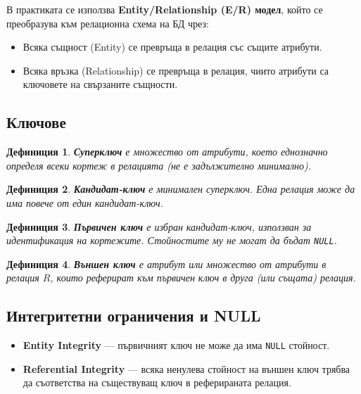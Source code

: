 \documentclass{scrartcl}
\newtheorem{definition}{Дефиниция}
\begin{document}
\begin{FlushLeft}
В практиката се използва \textbf{Entity/Relationship (E/R) модел}, който се преобразува към релационна схема на БД чрез:

\begin{itemize}
    \item Всяка същност (Entity) се превръща в релация със същите атрибути.
    \item Всяка връзка (Relationship) се превръща в релация, чиито атрибути са ключовете на свързаните същности.
\end{itemize}

\subsection{Ключове}

\begin{definition}
\textbf{\textit{Суперключ}} е множество от атрибути, което еднозначно определя всеки кортеж в релацията (не е задължително минимално).
\end{definition}

\begin{definition}
\textbf{\textit{Кандидат-ключ}} е минимален суперключ. Една релация може да има повече от един кандидат-ключ.
\end{definition}

\begin{definition}
\textbf{\textit{Първичен ключ}} е избран кандидат-ключ, използван за идентификация на кортежите. Стойностите му не могат да бъдат \texttt{NULL}.
\end{definition}

\begin{definition}
\textbf{\textit{Външен ключ}} е атрибут или множество от атрибути в релация $R$, които реферират към първичен ключ в друга (или същата) релация.
\end{definition}

\subsection{Интегритетни ограничения и NULL}

\begin{itemize}
    \item \textbf{Entity Integrity} --- първичният ключ не може да има \texttt{NULL} стойност.
    \item \textbf{Referential Integrity} --- всяка ненулева стойност на външен ключ трябва да съответства на съществуващ ключ в реферираната релация.
\end{itemize}


\end{FlushLeft}
\end{document}
